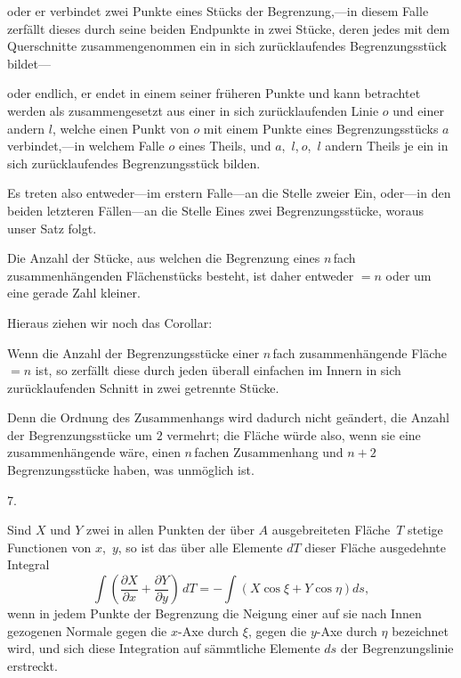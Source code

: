 \documentclass[a4paper,12pt]{article}
\begin{document}
oder er verbindet zwei Punkte eines St\"{u}cks der
Begrenzung,---in diesem Falle zerf\"{a}llt dieses durch seine
beiden Endpunkte in zwei St\"{u}cke, deren jedes mit dem
Querschnitte zusammengenommen ein in sich zur\"{u}cklaufendes
Begrenzungsst\"{u}ck bildet---

oder endlich, er endet in einem seiner fr\"{u}heren Punkte und
kann betrachtet werden als zusammengesetzt aus einer in sich
zur\"{u}cklaufenden Linie $o$ und einer andern $l$, welche einen
Punkt von $o$ mit einem Punkte eines Begrenzungsst\"{u}cks $a$
verbindet,---in welchem Falle $o$ eines Theils, und
$a$,~$l$,$~o$,~$l$ andern Theils je ein in sich
zur\"{u}cklaufendes Begrenzungsst\"{u}ck bilden.

Es treten also entweder---im erstern Falle---an die Stelle zweier
Ein, oder---in den beiden letzteren F\"{a}llen---an die Stelle
Eines zwei Begrenzungsst\"{u}cke, woraus unser Satz folgt.

Die Anzahl der St\"{u}cke, aus welchen die Begrenzung eines
$n \,$\-fach zusammenh\"{a}ngenden Fl\"{a}chenst\"{u}cks besteht, ist
daher entweder $= n$ oder um eine gerade Zahl kleiner.

Hieraus ziehen wir noch das Corollar:

Wenn die Anzahl der Begrenzungsst\"{u}cke einer $n \,$\-fach
zusammenh\"{a}ngende Fl\"{a}che $= n$ ist, so zerf\"{a}llt
diese durch jeden \"{u}berall einfachen im Innern in sich
zur\"{u}cklaufenden Schnitt in zwei getrennte St\"{u}cke.

Denn die Ordnung des Zusammenhangs wird dadurch nicht
ge\"{a}ndert, die Anzahl der Begrenzungsst\"{u}cke um $2$
vermehrt; die Fl\"{a}che w\"{u}rde also, wenn sie eine
zusammenh\"{a}ngende w\"{a}re, einen $n \,$\-fachen Zusammenhang und
$n + 2$ Begrenzungsst\"{u}cke haben, was unm\"{o}glich ist.

\medbreak

\centerline{7.}

\nobreak\medskip

Sind $X$ und $Y$ zwei in allen Punkten der \"{u}ber $A$
ausgebreiteten Fl\"{a}che~$T$ stetige Functionen von $x$,~$y$, so
ist das \"{u}ber alle Elemente $dT$ dieser Fl\"{a}che ausgedehnte
Integral
\[ \int \left(
         \frac{\partial X}{\partial x}
       + \frac{\partial Y}{\partial y}
      \right) \, dT
   = - \int (X \cos \xi + Y \cos \eta) ds,\]
wenn in jedem Punkte der Begrenzung die Neigung einer auf sie
nach Innen gezogenen Normale gegen die $x$-Axe durch $\xi$, gegen
die $y$-Axe durch $\eta$ bezeichnet wird, und sich diese
Integration auf s\"{a}mmtliche Elemente $ds$ der Begrenzungslinie
erstreckt.
\end{document}
